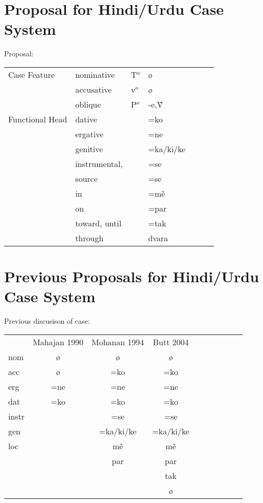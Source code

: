 \documentclass{article}
\begin{document}
\section{Proposal for Hindi/Urdu Case System}

\begin{example}Proposal:\\
\begin{tabular}{lllllll}
Case Feature & nominative & T$^o$ & \o \\
& accusative & v$^o$ & \o \\
& oblique & P$^o$ & -e,\~{V}\\
Functional Head & dative && =ko\\
 & ergative & & =ne\\
 & genitive && =ka/ki/ke \\
& instrumental, && =se\\
& source && =se \\
& in && =m\~{e}\\
& on && =par \\
& toward, until && =tak \\
& through && dvara\\
\end{tabular}
\end{example}

\section{Previous Proposals for Hindi/Urdu Case System}

\begin{example}Previous discusison of case:\\
\begin{tabular}{lccccccccc}
& Mahajan 1990 & Mohanan 1994 & Butt 2004\\
nom & \o & \o & \o \\
acc & \o & =ko & =ko\\
erg & =ne & =ne & =ne\\
dat & =ko & =ko & =ko\\
instr && =se & =se\\
gen && =ka/ki/ke & =ka/ki/ke\\
loc && m\~{e} & m\~{e}\\
&& par & par\\
&& & tak\\
&& & \o \\
\end{tabular}
\end{example}
\end{document}
